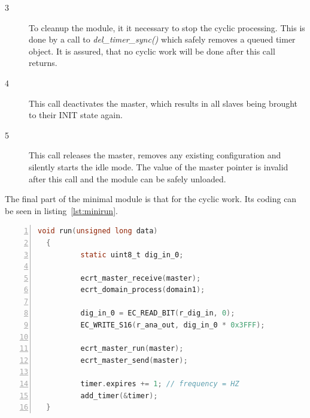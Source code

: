 \documentclass[a4paper,12pt,BCOR6mm,bibtotoc,idxtotoc]{scrbook}
\begin{document}
\begin{description}
\item[\normalfont\textcircled{\tiny 3}] To cleanup the module, it it
  necessary to stop the cyclic processing. This is done by a call to
  \textit{del\_timer\_sync()} which safely removes a queued timer
  object. It is assured, that no cyclic work will be done after this
  call returns.
\item[\normalfont\textcircled{\tiny 4}] This call deactivates the
  master, which results in all slaves being brought to their INIT
  state again.
\item[\normalfont\textcircled{\tiny 5}] This call releases the master,
  removes any existing configuration and silently starts the idle
  mode. The value of the master pointer is invalid after this call and
  the module can be safely unloaded.
\end{description}

The final part of the minimal module is that for the cyclic work. Its
coding can be seen in listing~\ref{lst:minirun}.

\begin{lstlisting}[language=C,numbers=left,caption={Minimal cyclic
    function},label={lst:minirun}]
  void run(unsigned long data)
  {
          static uint8_t dig_in_0;

          ecrt_master_receive(master);
          ecrt_domain_process(domain1);

          dig_in_0 = EC_READ_BIT(r_dig_in, 0);
          EC_WRITE_S16(r_ana_out, dig_in_0 * 0x3FFF);

          ecrt_master_run(master);
          ecrt_master_send(master);

          timer.expires += 1; // frequency = HZ
          add_timer(&timer);
  }
\end{lstlisting}
\end{document}
